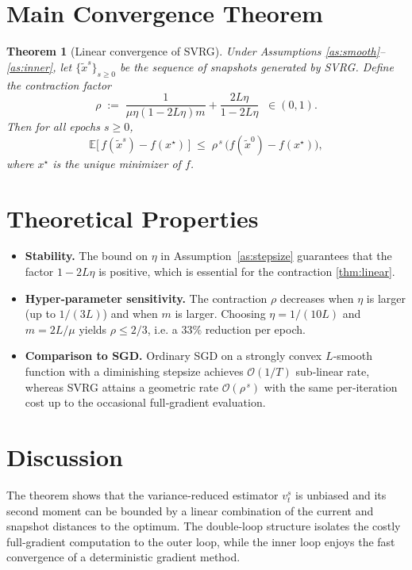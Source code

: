 \documentclass{article}
\newtheorem{theorem}{Theorem}
\newcommand{\E}{\mathbb{E}}
\begin{document}
\section*{Main Convergence Theorem}
\begin{theorem}[Linear convergence of SVRG]\label{thm:linear}
Under Assumptions \ref{as:smooth}–\ref{as:inner}, let $\{ \tilde{x}^{s}\}_{s\ge0}$ be the sequence of snapshots generated by SVRG. Define the contraction factor
\[
\rho \;:=\; \frac{1}{\mu\eta(1-2L\eta)m}+ \frac{2L\eta}{1-2L\eta}\;\;\in(0,1).
\]
Then for all epochs $s\ge0$,
\[
\E\!\bigl[\,f(\tilde{x}^{s})-f(x^{\star})\,\bigr]\;\le\;\rho^{\,s}\,\bigl(f(\tilde{x}^{0})-f(x^{\star})\bigr),
\]
where $x^{\star}$ is the unique minimizer of $f$.
\end{theorem}

\section*{Theoretical Properties}
\begin{itemize}
\item \textbf{Stability.} The bound on $\eta$ in Assumption~\ref{as:stepsize} guarantees that the factor $1-2L\eta$ is positive, which is essential for the contraction \eqref{thm:linear}.
\item \textbf{Hyper‑parameter sensitivity.} The contraction $\rho$ decreases when $\eta$ is larger (up to $1/(3L)$) and when $m$ is larger. Choosing $\eta=1/(10L)$ and $m=2L/\mu$ yields $\rho\le 2/3$, i.e. a $33\%$ reduction per epoch.
\item \textbf{Comparison to SGD.} Ordinary SGD on a strongly convex $L$‑smooth function with a diminishing stepsize achieves $\mathcal{O}(1/T)$ sub‑linear rate, whereas SVRG attains a geometric rate $\mathcal{O}(\rho^{\,s})$ with the same per‑iteration cost up to the occasional full‑gradient evaluation.
\end{itemize}

\section*{Discussion}
The theorem shows that the variance‑reduced estimator $v_{t}^{s}$ is unbiased and its second moment can be bounded by a linear combination of the current and snapshot distances to the optimum. The double‑loop structure isolates the costly full‑gradient computation to the outer loop, while the inner loop enjoys the fast convergence of a deterministic gradient method.
\end{document}
